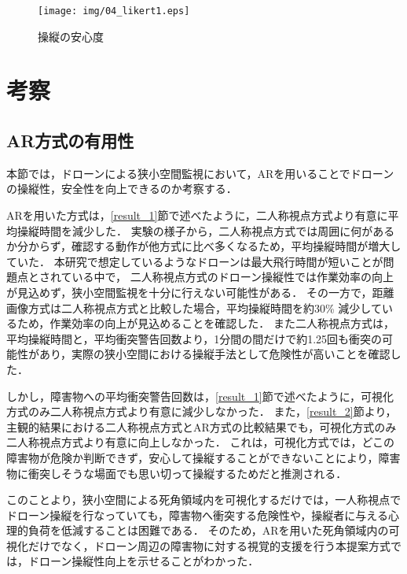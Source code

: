 \documentclass[submit, sigrecommended]{ipsj}
\begin{document}

    \begin{figure}[tb]
      \centering
      \texttt{[image: img/04\_likert1.eps]}
      \caption{操縦の安心度}
      \label{fig:04_likert1}
      \end{figure}
      




\section{考察}
\subsection{AR方式の有用性}
\label{discussion1}
本節では，ドローンによる狭小空間監視において，ARを用いることでドローンの操縦性，安全性を向上できるのか考察する．
\par
ARを用いた方式は，\ref{result_1}節で述べたように，二人称視点方式より有意に平均操縦時間を減少した．
実験の様子から，二人称視点方式では周囲に何があるか分からず，確認する動作が他方式に比べ多くなるため，平均操縦時間が増大していた．
本研究で想定しているようなドローンは最大飛行時間が短いことが問題点とされている中で\cite{article-drone14}\cite{article-drone15}\cite{article-drone16}，
二人称視点方式のドローン操縦性では作業効率の向上が見込めず，狭小空間監視を十分に行えない可能性がある．
その一方で，距離画像方式は二人称視点方式と比較した場合，平均操縦時間を約30\% 減少しているため，作業効率の向上が見込めることを確認した．
また二人称視点方式は，平均操縦時間と，平均衝突警告回数より，1分間の間だけで約1.25回も衝突の可能性があり，実際の狭小空間における操縦手法として危険性が高いことを確認した．
\par
しかし，障害物への平均衝突警告回数は，\ref{result_1}節で述べたように，可視化方式のみ二人称視点方式より有意に減少しなかった．
また，\ref{result_2}節より，主観的結果における二人称視点方式とAR方式の比較結果でも，可視化方式のみ二人称視点方式より有意に向上しなかった．
これは，可視化方式では，どこの障害物が危険か判断できず，安心して操縦することができないことにより，障害物に衝突しそうな場面でも思い切って操縦するためだと推測される．
\par
このことより，狭小空間による死角領域内を可視化するだけでは，一人称視点でドローン操縦を行なっていても，障害物へ衝突する危険性や，操縦者に与える心理的負荷を低減することは困難である．
そのため，ARを用いた死角領域内の可視化だけでなく，ドローン周辺の障害物に対する視覚的支援を行う本提案方式では，ドローン操縦性向上を示せることがわかった．
    
\end{document}
